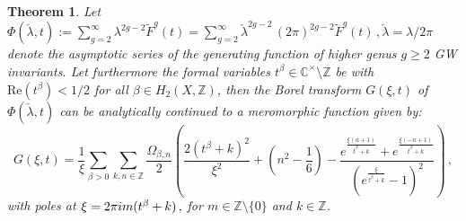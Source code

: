 \documentclass[10pt,a4paper]{amsart}
\newtheorem{thm}{Theorem}
\newcommand{\ii}{\textnormal{i}}
\begin{document}
\begin{thm} \label{thm:Borel}
Let $\Phi(\check{\lambda},t):= \sum_{g=2}^{\infty} \lambda^{2g-2} \tilde{F}^g(t)=  \sum_{g=2}^{\infty} \check{\lambda}^{2g-2} \, (2\pi)^{2g-2} \tilde{F}^g(t)\,, \check{\lambda}=\lambda/2\pi$ denote the asymptotic series of the generating function of  higher genus $g \ge 2$ GW invariants. Let furthermore the formal variables $t^{\beta} \in \mathbb{C}^{\times}\setminus \mathbb{Z}$ be with $\textrm{Re}(t^\beta) <1/2$ for all $\beta \in H_2(X,\mathbb{Z})$, then the Borel transform $G(\xi,t)$ of $\Phi(\check{\lambda},t)$  can be analytically continued to a meromorphic function given by:
\begin{equation} \label{eq:BorelTransform}
G(\xi,t) 
=  \frac{1}{\xi} \sum_{\beta>0} \sum_{k,n\in \mathbb{Z}} \frac{\Omega_{\beta, n}}{2}
\left(
  \frac{2(t^{\beta}+k)^2}{\xi^2}
  + \left(n^2 - \frac{1}{6}\right)
  - \frac{
      e^{\frac{\xi(n+1)}{t^{\beta}+k}}
      + e^{\frac{\xi(-n+1)}{t^{\beta}+k}}
    }{
       \left( e^{\frac{\xi}{t^{\beta}+k}} - 1 \right)^2
    } 
\right)\,,
\end{equation}
with poles at $\xi= 2\pi \ii m  (t^\beta+k)\,,$ for $m\in \mathbb{Z}\setminus \{0\}$ and $k\in \mathbb{Z}$.
\end{thm}
\end{document}
